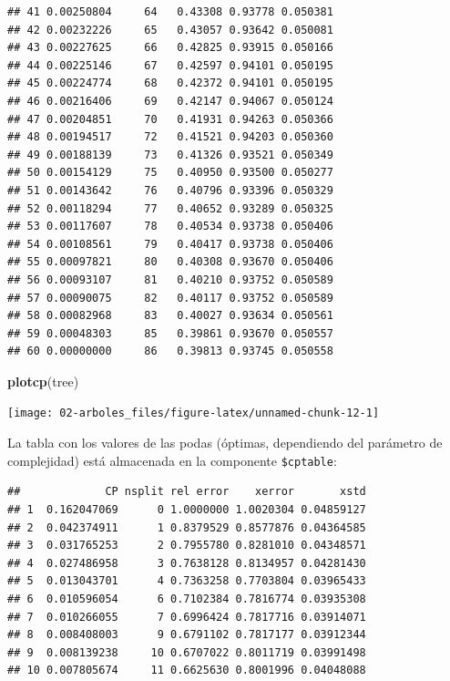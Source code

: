 \documentclass[
  spanish,
]{book}
\newenvironment{Shaded}{\begin{snugshade}}{\end{snugshade}}
\newcommand{\DecValTok}[1]{\textcolor[rgb]{0.00,0.00,0.81}{#1}}
\newcommand{\KeywordTok}[1]{\textcolor[rgb]{0.13,0.29,0.53}{\textbf{#1}}}
\newcommand{\NormalTok}[1]{#1}
\newcommand{\OperatorTok}[1]{\textcolor[rgb]{0.81,0.36,0.00}{\textbf{#1}}}
\theoremstyle{break}
\theoremstyle{definition}
\theoremstyle{definition}
\theoremstyle{definition}
\theoremstyle{remark}
\begin{document}
\begin{verbatim}
## 41 0.00250804     64   0.43308 0.93778 0.050381
## 42 0.00232226     65   0.43057 0.93642 0.050081
## 43 0.00227625     66   0.42825 0.93915 0.050166
## 44 0.00225146     67   0.42597 0.94101 0.050195
## 45 0.00224774     68   0.42372 0.94101 0.050195
## 46 0.00216406     69   0.42147 0.94067 0.050124
## 47 0.00204851     70   0.41931 0.94263 0.050366
## 48 0.00194517     72   0.41521 0.94203 0.050360
## 49 0.00188139     73   0.41326 0.93521 0.050349
## 50 0.00154129     75   0.40950 0.93500 0.050277
## 51 0.00143642     76   0.40796 0.93396 0.050329
## 52 0.00118294     77   0.40652 0.93289 0.050325
## 53 0.00117607     78   0.40534 0.93738 0.050406
## 54 0.00108561     79   0.40417 0.93738 0.050406
## 55 0.00097821     80   0.40308 0.93670 0.050406
## 56 0.00093107     81   0.40210 0.93752 0.050589
## 57 0.00090075     82   0.40117 0.93752 0.050589
## 58 0.00082968     83   0.40027 0.93634 0.050561
## 59 0.00048303     85   0.39861 0.93670 0.050557
## 60 0.00000000     86   0.39813 0.93745 0.050558
\end{verbatim}

\begin{Shaded}
\begin{Highlighting}[]
\KeywordTok{plotcp}\NormalTok{(tree)}
\end{Highlighting}
\end{Shaded}

\begin{center}\texttt{[image: 02-arboles\_files/figure-latex/unnamed-chunk-12-1]} \end{center}

La tabla con los valores de las podas (óptimas, dependiendo del parámetro de complejidad)
está almacenada en la componente \texttt{\$cptable}:

\begin{Shaded}
\end{Shaded}

\begin{verbatim}
##             CP nsplit rel error    xerror       xstd
## 1  0.162047069      0 1.0000000 1.0020304 0.04859127
## 2  0.042374911      1 0.8379529 0.8577876 0.04364585
## 3  0.031765253      2 0.7955780 0.8281010 0.04348571
## 4  0.027486958      3 0.7638128 0.8134957 0.04281430
## 5  0.013043701      4 0.7363258 0.7703804 0.03965433
## 6  0.010596054      6 0.7102384 0.7816774 0.03935308
## 7  0.010266055      7 0.6996424 0.7817716 0.03914071
## 8  0.008408003      9 0.6791102 0.7817177 0.03912344
## 9  0.008139238     10 0.6707022 0.8011719 0.03991498
## 10 0.007805674     11 0.6625630 0.8001996 0.04048088
\end{verbatim}
\end{document}
